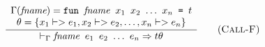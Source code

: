 \documentclass[10pt]{../sigplanconf}
\newcommand{\nfrac}[2]{\frac{\displaystyle{#1}}{\displaystyle{#2}}}
\newcommand{\tagsc}[1]{\tag{\scshape #1}}
\begin{document}
\begin{minipage}{2\linewidth}
\begin{equation}
  \nfrac{
    \begin{array}{c}
      \Gamma(\textit{fname}) =
        \texttt{fun \textit{\rmfamily fname} $x_1$ $x_2$ $\ldots$ $x_n$ = $t$}
        \\
      \theta = \{x_1 |-> e_1, x_2 |-> e_2, \ldots, x_n |-> e_n\}
    \end{array}
  }{
    |-_\Gamma \texttt{\textit{\rmfamily fname} $e_1$ $e_2$ $\ldots$ $e_n$} => t\theta
  } \tagsc{Call-F}
\end{equation}

\label{fig:semantics}
\end{minipage}



\begin{figure*}\centering



\end{figure*}
\end{document}
